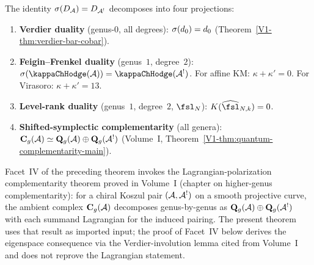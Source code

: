 \begin{theorem}
\label{thm:thqg-IV-four-facets}
The identity $\sigma(D_{\mathcal{A}}) = D_{\mathcal{A}^!}$ decomposes into four
projections:
\begin{enumerate}[label=\textup{(\Roman*)}]
\item \textbf{Verdier duality} (genus-$0$, all degrees):
 $\sigma(d_0) = d_0$
 (Theorem~\ref*{V1-thm:verdier-bar-cobar}).

\item \textbf{Feigin--Frenkel duality} (genus~$1$, degree~$2$):
 $\sigma(\kappaChHodge(\cA)) = \kappaChHodge(\cA^!)$.
 For affine KM: $\kappa + \kappa' = 0$.
 For Virasoro: $\kappa + \kappa' = 13$.

\item \textbf{Level-rank duality} (genus~$1$, degree~$2$, $\fsl_N$):
 $K(\widehat{\fsl}_{N,k}) = 0$.

\item \textbf{Shifted-symplectic complementarity} (all genera):
 $\mathbf{C}_g(\mathcal{A}) \simeq \mathbf{Q}_g(\mathcal{A}) \oplus
 \mathbf{Q}_g(\mathcal{A}^!)$
 (Volume~I, Theorem~\ref{V1-thm:quantum-complementarity-main}).
\end{enumerate}
\end{theorem}

\begin{remark}
\label{rem:thqg-IV-four-facets-attribution}
Facet~IV of the preceding theorem invokes the Lagrangian-polarization
complementarity theorem proved in Volume~I (chapter on higher-genus
complementarity): for a chiral Koszul pair $(\mathcal{A},\mathcal{A}^!)$ on a smooth
projective curve, the ambient complex $\mathbf{C}_g(\mathcal{A})$ decomposes
genus-by-genus as $\mathbf{Q}_g(\mathcal{A}) \oplus \mathbf{Q}_g(\mathcal{A}^!)$ with
each summand Lagrangian for the induced pairing. The present theorem
uses that result as imported input; the proof of Facet~IV below derives
the eigenspace consequence via the Verdier-involution lemma cited from
Volume~I and does not reprove the Lagrangian statement.
\end{remark}

